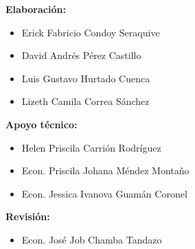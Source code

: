 \noindent\hspace{1.2cm}\begin{minipage}{0.85\textwidth}
  \fontsize{9.5pt}{12.5pt}\selectfont
  \textbf{Elaboración:}
  \begin{itemize}\setlength\itemsep{-0.2em}\setlength\parskip{0pt}
    \item Erick Fabricio Condoy Seraquive
    \item David Andrés Pérez Castillo
    \item Luis Gustavo Hurtado Cuenca
    \item Lizeth Camila Correa Sánchez
  \end{itemize}

  \vspace{0.3cm}
  \textbf{Apoyo técnico:}
  \begin{itemize}\setlength\itemsep{-0.2em}\setlength\parskip{0pt}
    \item Helen Priscila Carrión Rodríguez
    \item Econ. Priscila Johana Méndez Montaño
    \item Econ. Jessica Ivanova Guamán Coronel
  \end{itemize}

  \vspace{0.3cm}
  \textbf{Revisión:}
  \begin{itemize}\setlength\itemsep{-0.2em}\setlength\parskip{0pt}
    \item Econ. José Job Chamba Tandazo
  \end{itemize}
\end{minipage}

\clearpage
